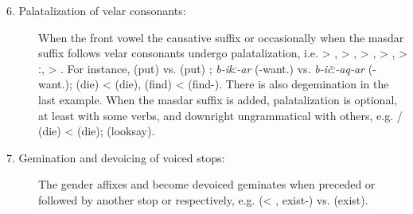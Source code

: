 \begin{description}
\item[6. Palatalization of velar consonants:] When the front vowel  the causative suffix  or occasionally when the masdar suffix  follows velar consonants undergo palatalization, i.e.  > , > ,  > ,  > ,  > ː,  > . For instance,  (put)  vs.  (put) ; \textit{b-ikː-ar} (-want.) vs. \textit{b-ičː-aq-ar} (-want.);  (die) <  (die),  (find) <  (find-). There is also degemination in the last example. When the masdar suffix is added, palatalization is optional, at least with some verbs, and downright ungrammatical with others, e.g.  /  (die) <  (die);  (looksay).
\item[7. Gemination and devoicing of voiced stops:] The gender affixes  and  become devoiced geminates when preceded or followed by another stop  or  respectively, e.g.  (< , exist-) vs.  (exist).

\end{description}



%
%
